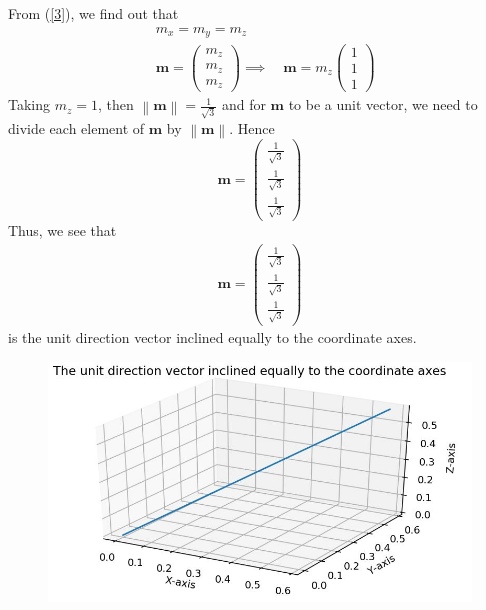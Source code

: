 \documentclass{article}
\newcommand{\myvec}[1]{\ensuremath{\begin{pmatrix}#1\end{pmatrix}}}
\newcommand{\norm}[1]{\left\lVert#1\right\rVert}
\let\vec\mathbf
\begin{document}
From (\ref{3}), we find out that
\begin{align}
& m_x = m_y = m_z \\
& \vec{m} = \myvec{ m_z\\ m_z \\m_z}  \implies \quad \vec{m} = m_z\myvec{ 1\\ 1 \\1}
\end{align}
Taking $m_z =1$, then $\norm{\vec{m}} = \frac{1}{\sqrt{3}}$ and for $\vec{m}$ to be a unit vector, we need to divide each element of $\vec{m}$ by $\norm{\vec{m}}$. Hence
\begin{equation}
\vec{m} = \myvec{\frac{1}{\sqrt{3}} \\ \frac{1}{\sqrt{3}} \\ \frac{1}{\sqrt{3}}}
\end{equation}
Thus, we see that  
\begin{eqnarray}
\vec{m} = \myvec{ \frac{1}{\sqrt{3}} \\ \frac{1}{\sqrt{3}} \\ \frac{1}{\sqrt{3}}}
\end{eqnarray}
is the unit direction vector inclined equally to the coordinate axes.
\begin{figure}[!htb]
	
	\centering
	
	\includegraphics[width=\columnwidth]{assignment1figure.jpg}
	
	\caption{\label{fig1}}
	
	\label{fig:}
	
\end{figure}
\end{document}
